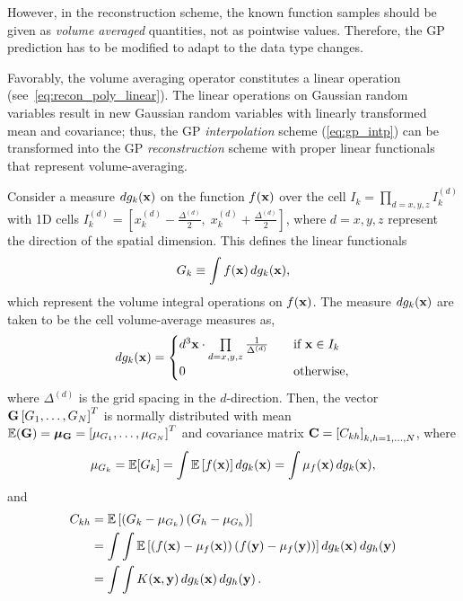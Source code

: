 However, in the reconstruction scheme, the known function samples should be given as \textit{volume averaged} quantities,
not as pointwise values. Therefore, the GP prediction has to be modified to adapt to the data type changes.

Favorably, the volume averaging operator constitutes a linear operation (see~\cref{eq:recon_poly_linear}).
The linear operations on Gaussian random variables result in new Gaussian random variables with
linearly transformed mean and covariance; thus, the GP \textit{interpolation} scheme (\cref{eq:gp_intp})
can be transformed into the GP \textit{reconstruction} scheme
with proper linear functionals that represent volume-averaging.

Consider a measure \( dg_{k} (\mathbf{x}) \) on the function \( f(\mathbf{x}) \) over the cell
\( I_{k} = \prod_{d = x,y,z} I_{k}^{(d)} \) with 1D cells
\( I_{k}^{(d)} = \left[ x_{k}^{(d)} - \frac{\Delta^{(d)}}{2},\; x_{k}^{(d)} + \frac{\Delta^{(d)}}{2} \right] \),
where \( d = x,y,z \) represent the direction of the spatial dimension.
This defines the linear functionals
\begin{equation}\label{eq:gp_vol_intg}
    G_{k} \equiv \int f (\mathbf{x}) \mathop{d g_{k}(\mathbf{x})},
\end{equation}
which represent the volume integral operations on \( f(\mathbf{x}) \).
The measure \( dg_{k} (\mathbf{x}) \) are taken to be the cell volume-average measures as,
\begin{equation}\label{eq:gp_dgk}
    dg_{k} (\mathbf{x}) = \begin{cases}
        d^{3} \mathbf{x} \cdot \prod\limits_{d = x,y,z} \frac{1}{\Delta^{(d)}} \quad &\text{if } \mathbf{x} \in I_{k} \\
        0 &\text{otherwise},
    \end{cases}
\end{equation}
where \( \Delta^{(d)} \) is the grid spacing in the \( d \)-direction.
Then, the vector \( \mathbf{G} \left[ G_{1}, \dots, G_{N} \right]^{T} \)
is normally distributed with mean \( \mathbb{E}(\mathbf{G}) = \bm{\mu}_{\mathbf{G}} = \left[ \mu_{G_{1}}, \dots, \mu_{G_{N}} \right]^{T} \)
and covariance matrix \( \mathbf{C} = \left[ C_{kh} \right]_{k,h = 1, \dots, N} \), where
\begin{equation}\label{eq:gp_mu_G}
    \mu_{G_{k}} = \mathbb{E} [G_{k}] = \int \mathbb{E} \left[ f(\mathbf{x}) \right] \mathop{d g_{k} (\mathbf{x})} = \int \mu_{f} (\mathbf{x}) \mathop{d g_{k} (\mathbf{x})},
\end{equation}
and
\begin{equation}\label{eq:gp_Ckh}
    \begin{split}
        C_{kh} &= \mathbb{E} \left[ \left( G_{k} - \mu_{G_{k}} \right) \left( G_{h} - \mu_{G_{h}} \right) \right] \\
               &= \int \int \mathbb{E} \left[ \left( f(\mathbf{x}) - \mu_{f} (\mathbf{x}) \right) \left( f(\mathbf{y}) - \mu_{f} (\mathbf{y}) \right)\right] \mathop{d g_{k}(\mathbf{x})} \mathop{d g_{h} (\mathbf{y})} \\
               &= \int \int K (\mathbf{x}, \mathbf{y}) \mathop{d g_{k} (\mathbf{x})} \mathop{d g_{h} (\mathbf{y})}.
    \end{split}
\end{equation}
